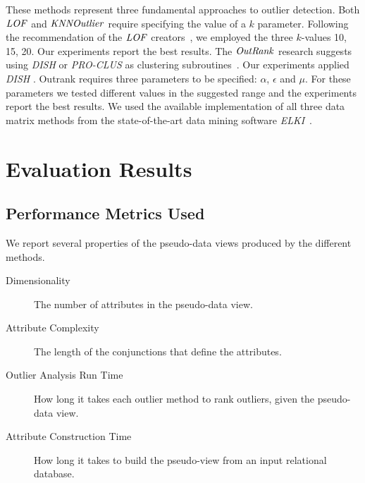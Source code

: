 					

								
	
	These methods represent three fundamental approaches to outlier detection. 
	Both $\it{LOF}$ and $\it{KNNOutlier}$ require specifying the value of a $k$ parameter. Following the recommendation of the $\it{LOF}$ creators~\cite{Breunig2000}, we employed the three $k$-values 10, 15, 20. Our experiments report the best results.
	The $\it{OutRank}$ research suggests using  \textit{DISH} or \textit{PRO-CLUS} as clustering subroutines~\cite{Muller2012}. Our experiments applied \textit{DISH} \cite{Kriegel2007}. Outrank requires three parameters to be specified: $\alpha$, $\epsilon$ and $\mu$. For these parameters we tested different values in the suggested range  and the experiments report the best results. 
	We used the available implementation of all three data matrix methods from the state-of-the-art data mining software \textit{ELKI}~\cite{Elke2013}. 
	\section{Evaluation Results}
	\subsection{Performance Metrics Used}
	We report several properties of the pseudo-\iid data views produced by the different methods. 
	\begin{description}
		\item[Dimensionality] The number of attributes in the pseudo-\iid data view.
		\item[Attribute Complexity] The length of the conjunctions that define the attributes.
		\item[Outlier Analysis Run Time] How long it takes each outlier method to rank outliers, given the pseudo-\iid data view.
		\item[Attribute Construction Time] How long it takes to build the pseudo-\iid view from an input relational database. 
	\end{description}
	
